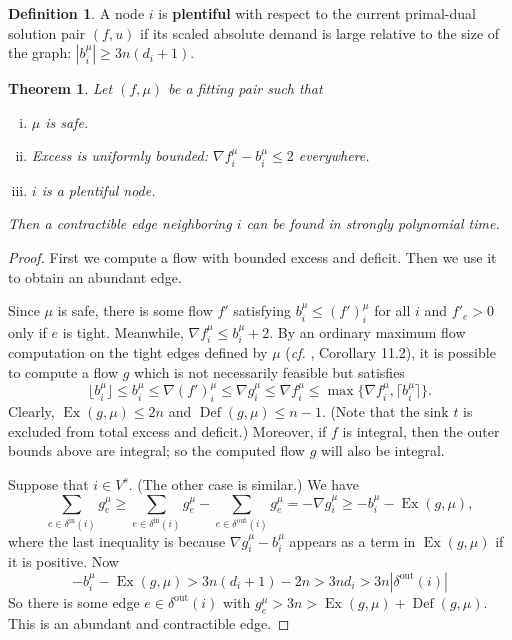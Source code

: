 \documentclass[11pt]{article}
\newtheorem{theorem}{Theorem}[section]
\theoremstyle{definition}
\newtheorem{definition}{Definition}[section]
\theoremstyle{definition}
\theoremstyle{definition}
\newcommand{\fu}{f^{\mu}}
\newcommand{\nfiu}{\nabla \fu_i}
\newcommand{\biu}{b_{i}^{\mu}}
\newcommand{\din}{\delta^{\text{in}}}
\newcommand{\dout}{\delta^{\text{out}}}
\newcommand{\vsrc}{V^{s}}
\DeclareMathOperator{\Ex}{Ex}
\DeclareMathOperator{\Def}{Def}
\begin{document}
    \begin{definition}
    A node $i$ is \textbf{plentiful} with respect
    to the current primal-dual solution pair $(f,u)$ if its scaled absolute
    demand is large relative to the size of the graph: $|b_i^{\mu}| \ge 3n(d_i + 1)$.
    \end{definition}
	\begin{theorem} \label{thm:2017-contraction}
		Let $(f, \mu)$ be a fitting pair such that
		\begin{enumerate}[(i)]
			\item $\mu$ is safe.
			\item Excess is uniformly bounded: $\nabla f_i^\mu - \biu \leq 2$ everywhere.
			\item $i$ is a plentiful node.
		\end{enumerate}
		Then a contractible edge neighboring $i$ can be found in strongly polynomial time.
	\end{theorem}
	\begin{proof}
		First we compute a flow with bounded excess and deficit. Then we use it to obtain
		an abundant edge.
		
		Since $\mu$ is safe, there is some flow $f'$ satisfying $\biu \leq (f')_i^\mu$
		for all $i$ and $f'_e > 0$ only if $e$ is tight. Meanwhile, $\nfiu \leq \biu + 2$.
		By an ordinary maximum flow computation on the tight edges defined by $\mu$
		(\emph{cf.} \cite{Schrijver2002}, Corollary 11.2),
		it is possible to compute a flow $g$ which is not necessarily feasible but satisfies
		\[ \lfloor \biu \rfloor \leq \biu \leq \nabla (f')_i^\mu
		   \leq \nabla g_i^\mu \leq \nfiu \leq \max \{\nfiu, \lceil\biu\rceil\}. \]
		Clearly, $\Ex(g, \mu) \leq 2n$ and $\Def(g, \mu) \leq n - 1$. (Note that the
		sink $t$ is excluded from total excess and deficit.) Moreover, if $f$ is
		integral, then the outer bounds above are integral; so
		the computed flow $g$ will also be integral.
	
		Suppose that $i \in \vsrc$. (The other case is similar.) We have
		\[ \sum_{e \in \din(i)} g^\mu_e \geq
		\sum_{e \in \din(i)} g^\mu_e - \sum_{e \in \dout(i)} g^\mu_e
		= -\nabla g^\mu_i \geq -b_i^\mu - \Ex(g, \mu), \]
		where the last inequality is because $\nabla g_i^\mu - \biu$ appears
		as a term in $\Ex(g, \mu)$ if it is positive. Now
		\[ -b_i^\mu - \Ex(g, \mu) > 3n(d_i + 1) - 2n > 3nd_i > 3n|\dout(i)| \]
		So there is some edge $e \in \dout(i)$ with
		$g^\mu_e > 3n > \Ex(g, \mu) + \Def(g, \mu)$. This is an abundant and contractible
		edge.
	\end{proof}
\end{document}
